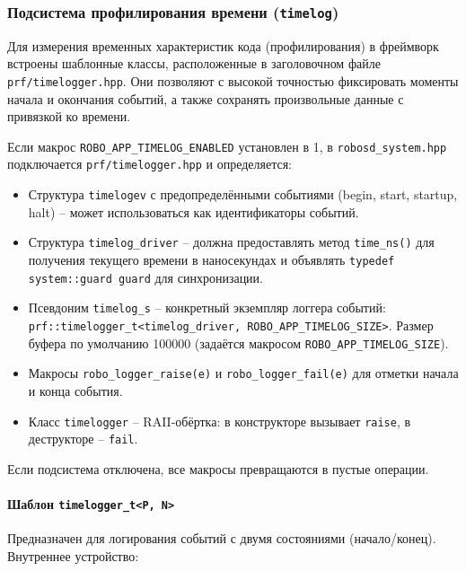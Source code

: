 \documentclass[a4paper,12pt]{article}
\begin{document}
\subsubsection{Подсистема профилирования времени (\texttt{timelog})}

Для измерения временных характеристик кода (профилирования) в фреймворк встроены шаблонные классы, расположенные в заголовочном файле \texttt{prf/timelogger.hpp}. Они позволяют с высокой точностью фиксировать моменты начала и окончания событий, а также сохранять произвольные данные с привязкой ко времени.

Если макрос \texttt{ROBO\_APP\_TIMELOG\_ENABLED} установлен в 1, в \texttt{robosd\_system.hpp} подключается \texttt{prf/timelogger.hpp} и определяется:

\begin{itemize}
    \item Структура \texttt{timelogev} с предопределёнными событиями (begin, start, startup, halt) -- может использоваться как идентификаторы событий.
    \item Структура \texttt{timelog\_driver} -- должна предоставлять метод \texttt{time\_ns()} для получения текущего времени в наносекундах и объявлять \texttt{typedef system::guard guard} для синхронизации.
    \item Псевдоним \texttt{timelog\_s} -- конкретный экземпляр логгера событий: \texttt{prf::timelogger\_t<timelog\_driver, ROBO\_APP\_TIMELOG\_SIZE>}. Размер буфера по умолчанию 100000 (задаётся макросом \texttt{ROBO\_APP\_TIMELOG\_SIZE}).
    \item Макросы \texttt{robo\_logger\_raise(e)} и \texttt{robo\_logger\_fail(e)} для отметки начала и конца события.
    \item Класс \texttt{timelogger} -- RAII-обёртка: в конструкторе вызывает \texttt{raise}, в деструкторе -- \texttt{fail}.
\end{itemize}

Если подсистема отключена, все макросы превращаются в пустые операции.

\paragraph{Шаблон \texttt{timelogger\_t<P, N>}}

Предназначен для логирования событий с двумя состояниями (начало/конец). Внутреннее устройство:
\end{document}
